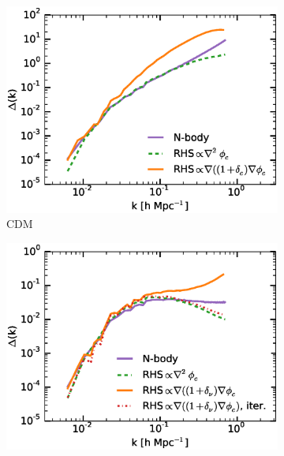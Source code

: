 \documentclass{aastex}
\begin{document}

\begin{figure}[h!]
  \centering
  \begin{subfigure}[t]{0.45\textwidth}
    \centering
    \includegraphics[width=\textwidth]{Figures/density_cdm_nl_0.eps}
    \caption{CDM}\label{fig:nlcdm}
  \end{subfigure}
  \begin{subfigure}[t]{0.45\textwidth}
    \centering
    \includegraphics[width=\textwidth]{Figures/density_nu_nl_0.eps}

\end{subfigure}
\end{figure}
\end{document}
